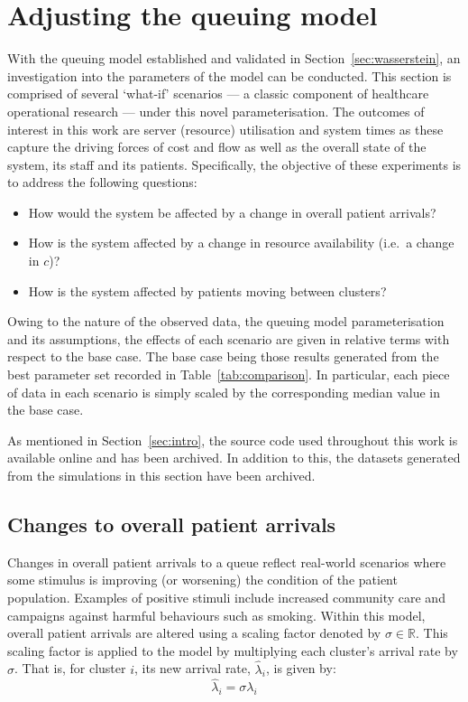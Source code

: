 \section{Adjusting the queuing model}\label{sec:scenarios}

With the queuing model established and validated in
Section~\ref{sec:wasserstein}, an investigation into the parameters of the model
can be conducted. This section is comprised of several `what-if' scenarios --- a
classic component of healthcare operational research --- under this novel
parameterisation. The outcomes of interest in this work are server (resource)
utilisation and system times as these capture the driving forces of cost and
flow as well as the overall state of the system, its staff and its patients.
Specifically, the objective of these experiments is to address the following
questions:
\begin{itemize}
    \item How would the system be affected by a change in overall patient
        arrivals?
    \item How is the system affected by a change in resource availability (i.e.\
        a change in \(c\))?
    \item How is the system affected by patients moving between clusters?
\end{itemize}

Owing to the nature of the observed data, the queuing model parameterisation
and its assumptions, the effects of each scenario are given in relative terms
with respect to the base case. The base case being those results generated from
the best parameter set recorded in Table~\ref{tab:comparison}. In particular,
each piece of data in each scenario is simply scaled by the corresponding median
value in the base case.

As mentioned in Section~\ref{sec:intro}, the source code used throughout this
work is available online and has been archived. %
In addition to this, the datasets generated from the simulations in this section
have been archived. %


\subsection{Changes to overall patient arrivals}\label{subsec:arrivals}

Changes in overall patient arrivals to a queue reflect real-world scenarios
where some stimulus is improving (or worsening) the condition of the patient
population. Examples of positive stimuli include increased community care and
campaigns against harmful behaviours such as smoking. Within this model, overall
patient arrivals are altered using a scaling factor denoted by
\(\sigma\in\mathbb{R}\). This scaling factor is applied to the model by
multiplying each cluster's arrival rate by \(\sigma\). That is, for cluster
\(i\), its new arrival rate, \(\hat\lambda_i\), is given by:
\begin{equation}\label{eq:lambda}
    \hat\lambda_{i} = \sigma\lambda_i
\end{equation}

